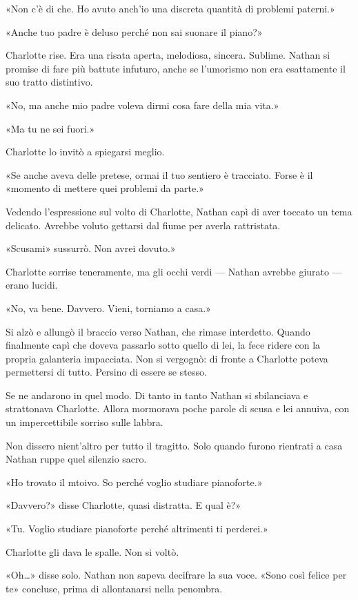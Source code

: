\documentclass[a4paper,oneside,11pt]{memoir}
\begin{document}
«Non c'è di che. Ho avuto anch'io una discreta quantità di problemi paterni.»

«Anche tuo padre è deluso perché non sai suonare il piano?»

Charlotte rise. Era una risata aperta, melodiosa, sincera. Sublime. Nathan si
promise di fare più battute infuturo, anche se l'umorismo non era esattamente il
suo tratto distintivo.

«No, ma anche mio padre voleva dirmi cosa fare della mia vita.»

«Ma tu ne sei fuori.»

Charlotte lo invitò a spiegarsi meglio.

«Se anche aveva delle pretese, ormai il tuo sentiero è tracciato. Forse è il
«momento di mettere quei problemi da parte.»

Vedendo l'espressione sul volto di Charlotte, Nathan capì di aver toccato un
tema delicato. Avrebbe voluto gettarsi dal fiume per averla rattristata.

«Scusami» sussurrò. Non avrei dovuto.»

Charlotte sorrise teneramente, ma gli occhi verdi --- Nathan avrebbe giurato ---
erano lucidi.

«No, va bene. Davvero. Vieni, torniamo a casa.»

Si alzò e allungò il braccio verso Nathan, che rimase interdetto. Quando
finalmente capì che doveva passarlo sotto quello di lei, la fece ridere con la
propria galanteria impacciata. Non si vergognò: di fronte a Charlotte poteva
permettersi di tutto. Persino di essere se stesso.

Se ne andarono in quel modo. Di tanto in tanto Nathan si sbilanciava e
strattonava Charlotte. Allora mormorava poche parole di scusa e lei annuiva, con
un impercettibile sorriso sulle labbra.

Non dissero nient'altro per tutto il tragitto. Solo quando furono rientrati a
casa Nathan ruppe quel silenzio sacro.

«Ho trovato il mtoivo. So perché voglio studiare pianoforte.»

«Davvero?» disse Charlotte, quasi distratta. E qual è?»

«Tu. Voglio studiare pianoforte perché altrimenti ti perderei.»

Charlotte gli dava le spalle. Non si voltò.

«Oh\dots{}» disse solo. Nathan non sapeva decifrare la sua voce. «Sono così
felice per te» concluse, prima di allontanarsi nella penombra.
\end{document}
